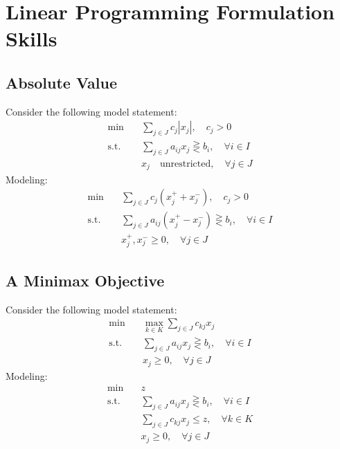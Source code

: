 			\section{Linear Programming Formulation Skills}
				\subsection{Absolute Value}
					Consider the following model statement:
					\begin{align}
						\min \quad & \sum_{j\in J}c_j|x_j|, \quad c_j > 0 \\
						\text{s.t.} \quad & \sum_{j\in J}a_{ij}x_j \gtreqless b_i, \quad \forall i\in I \\
						                  & x_j \quad \text{unrestricted}, \quad \forall j\in J 
					\end{align}
					Modeling:
					\begin{align}
						\min \quad & \sum_{j\in J}c_j(x_j^+ + x_j^-), \quad c_j > 0 \\
						\text{s.t.} \quad & \sum_{j\in J}a_{ij}(x_j^+ - x_j^-) \gtreqless b_i, \quad \forall i\in I \\
						                  & x_j^+, x_j^- \ge 0, \quad \forall j\in J 
					\end{align}

				\subsection{A Minimax Objective}
					Consider the following model statement:
					\begin{align}
						\min \quad & \max_{k\in K}\sum_{j\in J}c_{kj}x_j \\
						\text{s.t.} \quad & \sum_{j\in J}a_{ij}x_j \gtreqless b_i, \quad \forall i\in I \\
						                  & x_j \ge 0, \quad \forall j\in J 
					\end{align}
					Modeling:
					\begin{align}
						\min \quad & z \\
						\text{s.t.} \quad & \sum_{j\in J}a_{ij}x_j \gtreqless b_i, \quad \forall i\in I \\
										  & \sum_{j\in J}c_{kj}x_j \le z, \quad \forall k\in K \\
						                  & x_j \ge 0, \quad \forall j\in J 
					\end{align}

